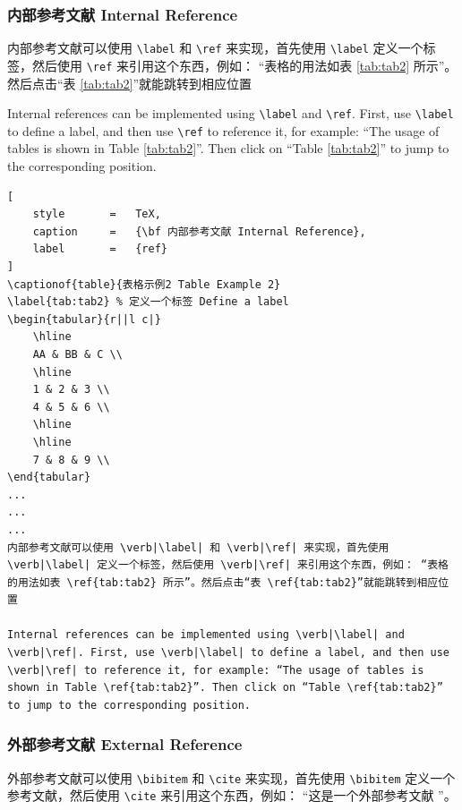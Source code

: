 \documentclass{article}
\begin{document}
\subsubsection{内部参考文献 Internal Reference}

内部参考文献可以使用 \verb|\label| 和 \verb|\ref| 来实现，首先使用 \verb|\label| 定义一个标签，然后使用 \verb|\ref| 来引用这个东西，例如： “表格的用法如表 \ref{tab:tab2} 所示”。然后点击“表 \ref{tab:tab2}”就能跳转到相应位置

Internal references can be implemented using \verb|\label| and \verb|\ref|. First, use \verb|\label| to define a label, and then use \verb|\ref| to reference it, for example: “The usage of tables is shown in Table \ref{tab:tab2}”. Then click on “Table \ref{tab:tab2}” to jump to the corresponding position.

\begin{lstlisting}[
    style       =   TeX,
    caption     =   {\bf 内部参考文献 Internal Reference},
    label       =   {ref}
]
\captionof{table}{表格示例2 Table Example 2}
\label{tab:tab2} % 定义一个标签 Define a label
\begin{tabular}{r||l c|}
    \hline
    AA & BB & C \\
    \hline
    1 & 2 & 3 \\
    4 & 5 & 6 \\
    \hline
    \hline
    7 & 8 & 9 \\
\end{tabular}
...
...
...
内部参考文献可以使用 \verb|\label| 和 \verb|\ref| 来实现，首先使用 \verb|\label| 定义一个标签，然后使用 \verb|\ref| 来引用这个东西，例如： “表格的用法如表 \ref{tab:tab2} 所示”。然后点击“表 \ref{tab:tab2}”就能跳转到相应位置

Internal references can be implemented using \verb|\label| and \verb|\ref|. First, use \verb|\label| to define a label, and then use \verb|\ref| to reference it, for example: “The usage of tables is shown in Table \ref{tab:tab2}”. Then click on “Table \ref{tab:tab2}” to jump to the corresponding position.
\end{lstlisting}

\subsubsection{外部参考文献 External Reference}

外部参考文献可以使用 \verb|\bibitem| 和 \verb|\cite| 来实现，首先使用 \verb|\bibitem| 定义一个参考文献，然后使用 \verb|\cite| 来引用这个东西，例如： “这是一个外部参考文献 \cite{1}”。
\end{document}
